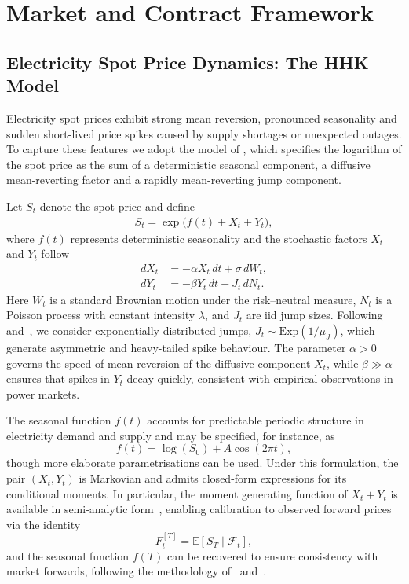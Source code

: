 \documentclass[a4paper,fleqn]{cas-dc}
\begin{document}
\clearpage

\section{Market and Contract Framework}

\subsection{Electricity Spot Price Dynamics: The HHK Model}

Electricity spot prices exhibit strong mean reversion, pronounced seasonality and sudden short-lived price spikes caused by supply shortages or unexpected outages. To capture these features we adopt the model of \cite{Hambly2009}, which specifies the logarithm of the spot price as the sum of a deterministic seasonal component, a diffusive mean-reverting factor and a rapidly mean-reverting jump component.

Let $S_t$ denote the spot price and define
\begin{align}\label{eq:model}
S_t = \exp\!\big(f(t) + X_t + Y_t\big),\end{align}
where $f(t)$ represents deterministic seasonality and the stochastic factors $X_t$ and $Y_t$ follow
\begin{align}
dX_t &= -\alpha X_t \, dt + \sigma\, dW_t, \label{eq:OU}\\
dY_t &= -\beta Y_t \, dt + J_t\, dN_t. \label{eq:jumpOU}
\end{align}
Here $W_t$ is a standard Brownian motion under the risk–neutral measure, $N_t$ is a Poisson process with constant intensity $\lambda$, and $J_t$ are iid jump sizes. Following~\cite{Hambly2009} and~\cite{cartea2005pricing}, we consider exponentially distributed jumps, $J_t \sim \mathrm{Exp}(1/\mu_J)$, which generate asymmetric and heavy-tailed spike behaviour. The parameter $\alpha>0$ governs the speed of mean reversion of the diffusive component \(X_t\), while \( \beta \gg \alpha \) ensures that spikes in \(Y_t\) decay quickly, consistent with empirical observations in power markets.

The seasonal function \(f(t)\) accounts for predictable periodic structure in electricity demand and supply and may be specified, for instance, as
$$
f(t) = \log(S_0) + A \cos(2\pi t),
$$
though more elaborate parametrisations can be used. Under this formulation, the pair $(X_t,Y_t)$ is Markovian and admits closed-form expressions for its conditional moments. In particular, the moment generating function of $ X_t + Y_t$ is available in semi-analytic form~\cite{Hambly2009}, enabling calibration to observed forward prices via the identity
$$
F_t^{[T]} = \mathbb{E}\left[S_T \mid \mathcal{F}_t \right],
$$
and the seasonal function $f(T)$ can be recovered to ensure consistency with market forwards, following the methodology of~\cite{cartea2005pricing} and~\cite{lucia2002electricity}.
\end{document}
